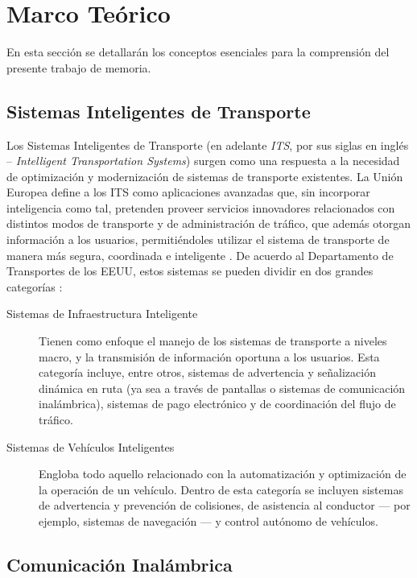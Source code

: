 \section{Marco Teórico}

En esta sección se detallarán los conceptos esenciales para la comprensión del presente trabajo de memoria.

\subsection{Sistemas Inteligentes de Transporte}

Los Sistemas Inteligentes de Transporte (en adelante \emph{ITS}, por sus siglas en inglés -- \textit{Intelligent Transportation Systems}) surgen como una respuesta a la necesidad de optimización y modernización de sistemas de transporte existentes. La Unión Europea define a los ITS como aplicaciones avanzadas que, sin incorporar inteligencia como tal, pretenden proveer servicios innovadores relacionados con distintos modos de transporte y de administración de tráfico, que además otorgan información a los usuarios, permitiéndoles utilizar el sistema de transporte de manera más segura, coordinada e inteligente \cite{eudirective}. De acuerdo al Departamento de Transportes de los EEUU, estos sistemas se pueden dividir en dos grandes categorías \cite{usdot}:
\begin{description}
    \item [Sistemas de Infraestructura Inteligente] Tienen como enfoque el manejo de los sistemas de transporte a niveles macro, y la transmisión de información oportuna a los usuarios. Esta categoría incluye, entre otros, sistemas de advertencia y señalización dinámica en ruta (ya sea a través de pantallas o sistemas de comunicación inalámbrica), sistemas de pago electrónico y de coordinación del flujo de tráfico.
    
    \item [Sistemas de Vehículos Inteligentes] Engloba todo aquello relacionado con la automatización y optimización de la operación de un vehículo. Dentro de esta categoría se incluyen sistemas de advertencia y prevención de colisiones, de asistencia al conductor --- por ejemplo, sistemas de navegación --- y control autónomo de vehículos.
    
\end{description}

\subsection{Comunicación Inalámbrica}

